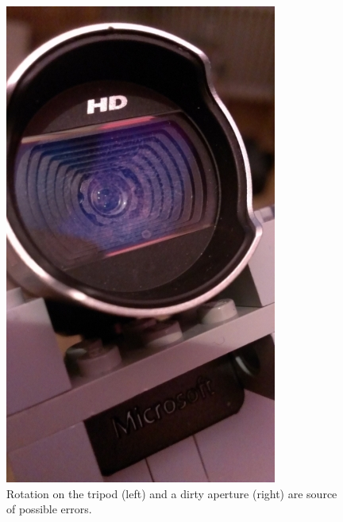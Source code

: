 \documentclass{scrartcl}
\begin{document}
\begin{figure}[H]
\begin{minipage}{.5\textwidth}
  \includegraphics[width=.8\linewidth]{img/lense.jpg}
\end{minipage}
\caption{Rotation on the tripod (left) and a dirty aperture (right) are source of possible errors.}
\label{fig:errorsources}
\end{figure}
\end{document}
